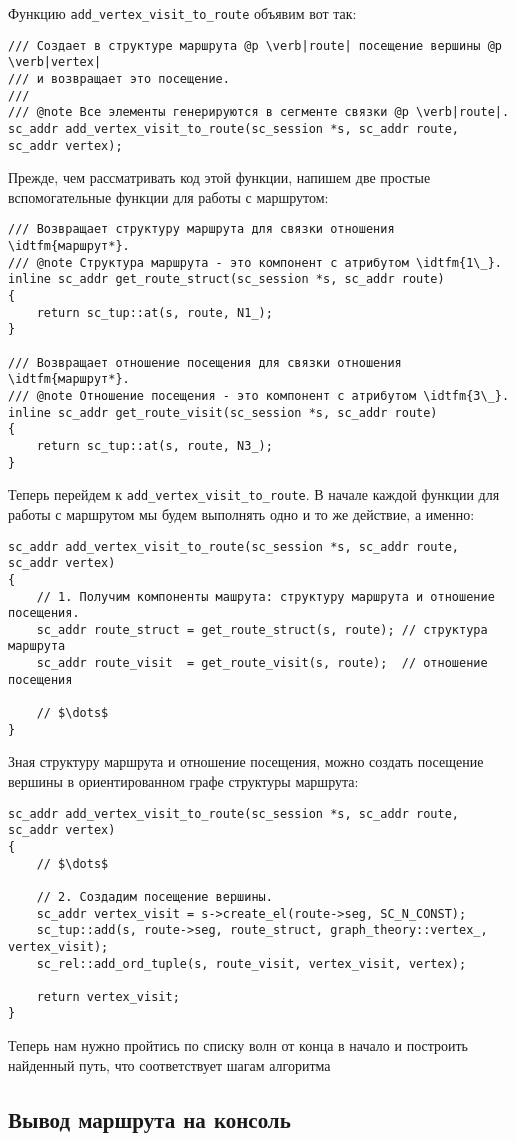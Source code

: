 Функцию \lstinline|add_vertex_visit_to_route| объявим вот так:
\begin{lstlisting}[texcl]
/// Создает в структуре маршрута @p \verb|route| посещение вершины @p \verb|vertex|
/// и возвращает это посещение.
///
/// @note Все элементы генерируются в сегменте связки @p \verb|route|.
sc_addr add_vertex_visit_to_route(sc_session *s, sc_addr route, sc_addr vertex);
\end{lstlisting}

Прежде, чем рассматривать код этой функции, напишем две простые
вспомогательные функции для работы с маршрутом:
\begin{lstlisting}[texcl]
/// Возвращает структуру маршрута для связки отношения \idtfm{маршрут*}.
/// @note Структура маршрута - это компонент с атрибутом \idtfm{1\_}.
inline sc_addr get_route_struct(sc_session *s, sc_addr route)
{
    return sc_tup::at(s, route, N1_);
}

/// Возвращает отношение посещения для связки отношения \idtfm{маршрут*}.
/// @note Отношение посещения - это компонент с атрибутом \idtfm{3\_}.
inline sc_addr get_route_visit(sc_session *s, sc_addr route)
{
    return sc_tup::at(s, route, N3_);
}
\end{lstlisting}

Теперь перейдем к \lstinline|add_vertex_visit_to_route|. В начале
каждой функции для работы с маршрутом мы будем выполнять одно и то же
действие, а именно:
\begin{lstlisting}[texcl]
sc_addr add_vertex_visit_to_route(sc_session *s, sc_addr route, sc_addr vertex)
{
    // 1. Получим компоненты машрута: структуру маршрута и отношение посещения.
    sc_addr route_struct = get_route_struct(s, route); // структура маршрута
    sc_addr route_visit  = get_route_visit(s, route);  // отношение посещения

    // $\dots$
}
\end{lstlisting}

Зная структуру маршрута и отношение посещения, можно создать посещение
вершины в ориентированном графе структуры маршрута:
\begin{lstlisting}[texcl]
sc_addr add_vertex_visit_to_route(sc_session *s, sc_addr route, sc_addr vertex)
{
    // $\dots$

    // 2. Создадим посещение вершины.
    sc_addr vertex_visit = s->create_el(route->seg, SC_N_CONST);
    sc_tup::add(s, route->seg, route_struct, graph_theory::vertex_, vertex_visit);
    sc_rel::add_ord_tuple(s, route_visit, vertex_visit, vertex);

    return vertex_visit;
}
\end{lstlisting}

Теперь нам нужно пройтись по списку волн от конца в начало и построить найденный путь, что соответствует шагам алгоритма 

\subsection{Вывод маршрута на консоль}
\label{sec:libscprg_fmp_print_route}




